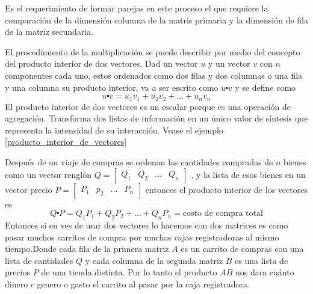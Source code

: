 Es el requerimiento de formar parejas en este proceso el que requiere la comparación de la dimensión columna de la matris primaria y la dimensión de fila de la matriz secundaria.

El procedimiento de la multiplicación se puede describir por medio del concepto del producto interior de dos vectores. Dad un vector \(u\) y un vector \(v\) con \(n\) componentes cada uno, estos ordenados como dos filas y dos columnas o una fila y una columna su producto interior, va a ser escrito como \(u \centerdot v\) y se define como 
\[
u \centerdot v = u_1v_1 + u_2v_2 + \dots + u_nv_n
\] 
El producto interior de dos vectores es un escalar porque es una operación de agregación. Transforma dos listas de información en un único valor de síntesis que representa la intensidad de su interacción. Vease el ejemplo \ref{producto_interior_de_vectores}
\begin{ejemplo}
    \label{producto_interior_de_vectores}
    Después de un viaje de compras se ordenan las cantidades compradas de \(n\) bienes como un vector renglón 
    \(Q = \begin{bmatrix}
    Q_1 & Q_2 & \dots & Q_n
    \end{bmatrix}\)
    , y la lista de esos bienes en un vector precio \(
    P = \begin{bmatrix}
        P_1 & p_2 & \dots & P_n
    \end{bmatrix}
    \)
    entonces el producto interior de los vectores es 
    \[
    Q \centerdot P = Q_1P_1 + Q_2P_2 + \dots + Q_nP_n = \text{costo de compra total}
    \]
    Entonces si en ves de usar dos vectores lo hacemos con dos matrices es como pasar muchos carritos de compra por muchas cajas registradoras al mismo tiempo.Donde cada fila de la primera matriz \(A\) es un carrito de compras con una lista de cantidades \(Q\) y cada columna de la segunda matriz \(B\) es una lista de precios \(P\) de una tienda distinta. Por lo tanto el producto \(AB\) nos dara cuánto dinero \(c\) genero o gasto el carrito al pasar por la caja registradora.
\end{ejemplo}
